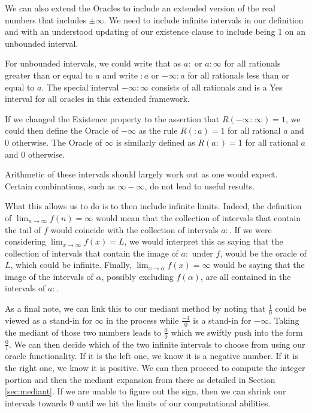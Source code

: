 \documentclass[12pt]{article}
\begin{document}
We can also extend the Oracles to include an extended version of the real numbers that includes $\pm \infty$. We need to include infinite intervals in our definition and with an understood updating of our existence clause to include being 1 on an unbounded interval.

For unbounded intervals, we could write that as $a:$ or $a:\infty$ for all rationals greater than or equal to $a$ and write $:a$ or $-\infty:a$ for all rationals less than or equal to $a$. The special interval $-\infty:\infty$ consists of all rationals and is a Yes interval for all oracles in this extended framework. 

If we changed the Existence property to the assertion that $R(-\infty:\infty)=1$, we could then define the Oracle of $-\infty$ as the rule $R(:a) = 1$ for all rational $a$ and 0 otherwise. The Oracle of $\infty$ is similarly defined as $R(a:)=1$  for all rational $a$ and 0 otherwise. 

Arithmetic of these intervals should largely work out as one would expect. Certain combinations, such as $\infty-\infty$, do not lead to useful results. 

What this allows us to do is to then include infinite limits. Indeed, the definition of $\lim_{n\to \infty} f(n) = \infty$ would mean that the collection of intervals that contain the tail of $f$ would coincide with the collection of intervals $a:$. If we were considering $\lim_{x \to \infty} f(x) = L$, we would interpret this as saying that the collection of intervals that contain the image of $a:$ under $f$, would be the oracle of $L$, which could be infinite.  Finally, $\lim_{x \to \alpha} f(x) = \infty$ would be saying that the image of the intervals of $\alpha$, possibly excluding $f(\alpha)$, are all contained in the intervals of $a:$. 

As a final note, we can link this to our mediant method by noting that $\frac{1}{0}$ could be viewed as a stand-in for $\infty$ in the process while $\frac{-1}{0}$ is a stand-in for $-\infty$. Taking the mediant of those two numbers leads to $\frac{0}{0}$ which we swiftly push into the form $\frac{0}{1}$. We can then decide which of the two infinite intervals to choose from using our oracle functionality. If it is the left one, we know it is a negative number. If it is the right one, we know it is positive. We can then proceed to compute the integer portion and then the mediant expansion from there as detailed in Section \ref{sec:mediant}. If we are unable to figure out the sign, then we can shrink our intervals towards $0$ until we hit the limits of our computational abilities. 
\end{document}
